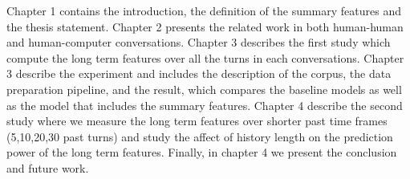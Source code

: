 Chapter 1 contains the introduction, the definition of the summary features and the thesis statement. Chapter 2 presents the related work in both human-human and human-computer conversations. Chapter 3 describes the first study which compute the long term features over all the turns in each conversations. Chapter 3 describe the experiment and includes the description of the corpus, the data preparation pipeline, and the result, which compares the baseline models as well as the model that includes the summary features. Chapter 4 describe the second study where we measure the long term features over shorter past time frames (5,10,20,30 past turns) and study the affect of history length on the prediction power of the long term features. Finally, in chapter 4 we present the conclusion and future work.
